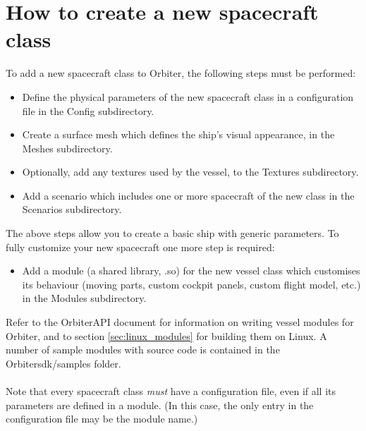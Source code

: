 \documentclass[Orbiter Developer Manual.tex]{subfiles}
\begin{document}
\section{How to create a new spacecraft class}
To add a new spacecraft class to Orbiter, the following steps must be performed:

\begin{itemize}
\item Define the physical parameters of the new spacecraft class in a configuration file in the Config subdirectory.
\item Create a surface mesh which defines the ship's visual appearance, in the Meshes subdirectory.
\item Optionally, add any textures used by the vessel, to the Textures subdirectory.
\item Add a scenario which includes one or more spacecraft of the new class in the Scenarios subdirectory.
\end{itemize}

\noindent
The above steps allow you to create a basic ship with generic parameters. To fully customize your new spacecraft one more step is required:

\begin{itemize}
\item Add a module (a shared library, .so) for the new vessel class which customises its behaviour (moving parts, custom cockpit panels, custom flight model, etc.) in the Modules subdirectory.
\end{itemize}

Refer to the OrbiterAPI document for information on writing vessel modules for Orbiter, and to section \ref{sec:linux_modules} for building them on Linux. A number of sample modules with source code is contained in the Orbitersdk/samples folder.\\
\\
Note that every spacecraft class \textit{must} have a configuration file, even if all its parameters are defined in a module. (In this case, the only entry in the configuration file may be the module name.)
\end{document}
